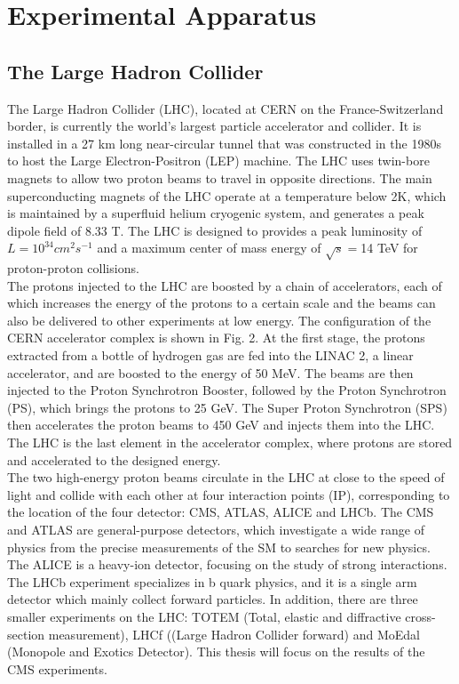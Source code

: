 \documentclass[thesis.tex]{subfiles}
\begin{document}
\chapter{Experimental Apparatus}

\section{The Large Hadron Collider}
The Large Hadron Collider (LHC), located at CERN on the France-Switzerland border, is currently the world's largest particle accelerator and collider. 
It is installed in a 27 km long near-circular tunnel that was constructed in the 1980s to host the Large Electron-Positron (LEP) machine. 
The LHC uses twin-bore magnets to allow two proton beams to travel in opposite directions. 
The main superconducting magnets of the LHC operate at a temperature below 2K, which is maintained by a superfluid helium cryogenic system, and generates a peak dipole field of 8.33 T. 
The LHC is designed to provides a peak luminosity of $L = 10^{34}cm^{2}s^{-1}$ and a maximum center of mass energy of $\sqrt{s} = $14 TeV for proton-proton collisions.  \\

The protons injected to the LHC are boosted by a chain of accelerators, each of which increases the energy of the protons to a certain scale and the beams can also be delivered to other experiments at low energy. 
The configuration of the CERN accelerator complex is shown in Fig. 2. 
At the first stage, the protons extracted from a bottle of hydrogen gas are fed into the LINAC 2, a linear accelerator, and are boosted to the energy of 50 MeV.  
The beams are then injected to the Proton Synchrotron Booster, followed by the Proton Synchrotron (PS), which brings the protons to 25 GeV. 
The Super Proton Synchrotron (SPS) then accelerates the proton beams to 450 GeV and injects them into the LHC. 
The LHC is the last element in the accelerator complex, where protons are stored and accelerated to the designed energy. \\

The two high-energy proton beams circulate in the LHC at close to the speed of light and collide with each other at four interaction points (IP), corresponding to the location of the four detector: CMS, ATLAS, ALICE and LHCb. 
The CMS and ATLAS are general-purpose detectors, which investigate a wide range of physics from the precise measurements of the SM to searches for new physics. 
The ALICE is a heavy-ion detector, focusing on the study of strong interactions. 
The LHCb experiment specializes in b quark physics, and it is a single arm detector which mainly collect forward particles. 
In addition, there are three smaller experiments on the LHC: TOTEM (Total, elastic and diffractive cross-section measurement), LHCf ((Large Hadron Collider forward) and MoEdal (Monopole and Exotics Detector). 
This thesis will focus on the results of the CMS experiments. 
\end{document}
